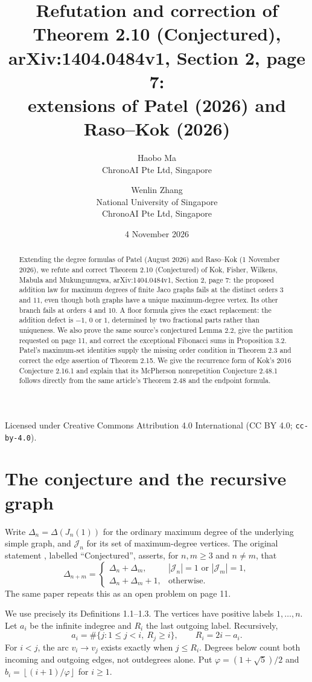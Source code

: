 \documentclass[11pt]{article}
\title{Refutation and correction of Theorem 2.10 (Conjectured),\texorpdfstring{\\}{ }arXiv:1404.0484v1, Section 2, page 7:\texorpdfstring{\\}{ }extensions of Patel (2026) and Raso--Kok (2026)}
\author{Haobo Ma\\\small ChronoAI Pte Ltd, Singapore
\and Wenlin Zhang\\\small National University of Singapore\\\small ChronoAI Pte Ltd, Singapore}
\date{4 November 2026}
\newcommand{\fl}[1]{\left\lfloor #1\right\rfloor}
\newcommand{\J}{\mathcal J}
\newcommand{\ph}{\varphi}
\begin{document}
\maketitle
\begin{abstract}
Extending the degree formulas of Patel (August 2026) and Raso--Kok
(1 November 2026), we refute and correct Theorem 2.10 (Conjectured) of
Kok, Fisher, Wilkens, Mabula and Mukungunugwa, arXiv:1404.0484v1,
Section 2, page 7: the proposed addition
law for maximum degrees of finite Jaco graphs fails at the distinct orders
$3$ and $11$, even though both graphs have a unique maximum-degree vertex.
Its other branch fails at orders $4$ and $10$. A floor formula gives the
exact replacement: the addition defect is $-1$, $0$ or $1$, determined by
two fractional parts rather than uniqueness. We also prove the same
source's conjectured Lemma 2.2, give the partition requested on page 11,
and correct the exceptional Fibonacci sums in Proposition 3.2.
Patel's maximum-set identities supply the missing order condition in
Theorem 2.3 and correct the edge assertion of Theorem 2.15.
We give the recurrence form of Kok's 2016 Conjecture 2.16.1 and explain
that its McPherson nonrepetition Conjecture 2.48.1 follows directly from
the same article's Theorem 2.48 and the endpoint formula.
\end{abstract}
\begin{center}\small Licensed under Creative Commons Attribution 4.0 International
(CC BY 4.0; \texttt{cc-by-4.0}).\end{center}

\section{The conjecture and the recursive graph}
Write $\Delta_n=\Delta(J_n(1))$ for the ordinary maximum degree of the
underlying simple graph, and $\J_n$ for its set of maximum-degree vertices.
The original statement \cite[Theorem 2.10, p.~7]{original}, labelled
``Conjectured'', asserts, for $n,m\ge3$ and $n\ne m$, that
\begin{equation}\label{posed}
 \Delta_{n+m}=\begin{cases}
 \Delta_n+\Delta_m,& |\J_n|=1\text{ or }|\J_m|=1,\\
 \Delta_n+\Delta_m+1,&\text{otherwise}.
 \end{cases}
\end{equation}
The same paper repeats this as an open problem on page 11.

We use precisely its Definitions 1.1--1.3. The vertices have positive
labels $1,\ldots,n$. Let $a_i$ be the infinite indegree and $R_i$ the last
outgoing label. Recursively,
\begin{equation}\label{recurrence}
 a_i=\#\{j:1\le j<i,\ R_j\ge i\},\qquad R_i=2i-a_i.
\end{equation}
For $i<j$, the arc $v_i\to v_j$ exists exactly when $j\le R_i$.
Degrees below count both incoming and outgoing edges, not outdegrees alone.
Put $\ph=(1+\sqrt5)/2$ and $b_i=\fl{(i+1)/\ph}$ for $i\ge1$.
\end{document}
